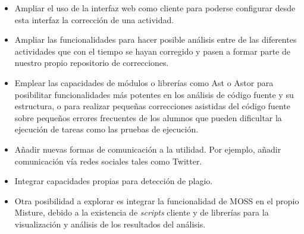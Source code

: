 \begin{itemize}
\item Ampliar el uso de la interfaz web como cliente para poderse configurar desde esta interfaz la corrección de una actividad.

\item Ampliar las funcionalidades para hacer posible análisis entre de las diferentes actividades que con el tiempo se hayan corregido y pasen a formar parte de nuestro propio repositorio de correcciones.

\item Emplear las capacidades de módulos o librerías como Ast o Astor para posibilitar funcionalidades más potentes en los análisis de código fuente y su estructura, o para realizar pequeñas correcciones asistidas del código fuente sobre pequeños errores frecuentes de los alumnos que pueden dificultar la ejecución de tareas como las pruebas de ejecución.

\item Añadir nuevas formas de comunicación a la utilidad. Por ejemplo, añadir comunicación vía redes sociales tales como Twitter.

\item Integrar capacidades propias para detección de plagio.

\item Otra posibilidad a explorar es integrar la funcionalidad de MOSS en el propio Misture, debido a la existencia de \textit{scripts} cliente y de librerías para la visualización y análisis de los resultados del análisis.
\end{itemize}
